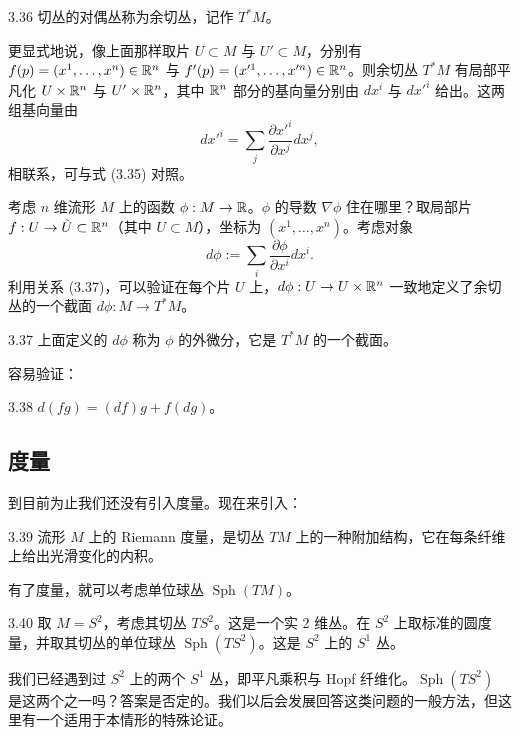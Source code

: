 \begin{definition}{3.36}
切丛的对偶丛称为余切丛，记作 $T^*M$。
\end{definition}

更显式地说，像上面那样取片 $U\subset M$ 与 $U'\subset M$，分别有 $f(p)=(x^1,\dots,x^n)\in\mathbb{R}^n$ 与 $f'(p)=(x'^1,\dots,x'^n)\in\mathbb{R}^n$。则余切丛 $T^*M$ 有局部平凡化 $U\times\mathbb{R}^n$ 与 $U'\times\mathbb{R}^n$，其中 $\mathbb{R}^n$ 部分的基向量分别由 $dx^i$ 与 $dx'^i$ 给出。这两组基向量由
\[
dx'^i=\sum_j\frac{\partial x'^i}{\partial x^j}dx^j,
\tag{3.37}
\]
相联系，可与式 (3.35) 对照。

考虑 $n$ 维流形 $M$ 上的函数 $\phi:M\to\mathbb{R}$。$\phi$ 的导数 $\nabla\phi$ 住在哪里？取局部片 $f:U\to\tilde U\subset\mathbb{R}^n$（其中 $U\subset M$），坐标为 $(x^1,\dots,x^n)$。考虑对象
\[
d\phi:=\sum_i\frac{\partial\phi}{\partial x^i}dx^i.
\tag{3.38}
\]
利用关系 (3.37)，可以验证在每个片 $U$ 上，$d\phi:U\to U\times\mathbb{R}^n$ 一致地定义了余切丛的一个截面 $d\phi:M\to T^*M$。

\begin{definition}{3.37}
上面定义的 $d\phi$ 称为 $\phi$ 的外微分，它是 $T^*M$ 的一个截面。
\end{definition}

容易验证：

\begin{proposition}{3.38}
$d(fg)=(df)g+f(dg)$。
\end{proposition}

\subsection{度量}

到目前为止我们还没有引入度量。现在来引入：

\begin{definition}{3.39}
流形 $M$ 上的 Riemann 度量，是切丛 $TM$ 上的一种附加结构，它在每条纤维上给出光滑变化的内积。
\end{definition}

有了度量，就可以考虑单位球丛 $\operatorname{Sph}(TM)$。

\begin{example}{3.40}
取 $M=S^2$，考虑其切丛 $TS^2$。这是一个实 2 维丛。在 $S^2$ 上取标准的圆度量，并取其切丛的单位球丛 $\operatorname{Sph}(TS^2)$。这是 $S^2$ 上的 $S^1$ 丛。
\end{example}

我们已经遇到过 $S^2$ 上的两个 $S^1$ 丛，即平凡乘积与 Hopf 纤维化。$\operatorname{Sph}(TS^2)$ 是这两个之一吗？答案是否定的。我们以后会发展回答这类问题的一般方法，但这里有一个适用于本情形的特殊论证。

